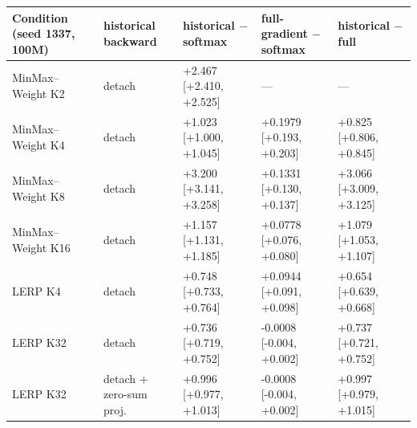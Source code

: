 \begin{tabular}{lllll}
\toprule
Condition (seed 1337, 100M) & historical backward & historical $-$ softmax & full-gradient $-$ softmax & historical $-$ full \\
\midrule
MinMax--Weight K2 & detach & +2.467 [+2.410, +2.525] & --- & --- \\
MinMax--Weight K4 & detach & +1.023 [+1.000, +1.045] & +0.1979 [+0.193, +0.203] & +0.825 [+0.806, +0.845] \\
MinMax--Weight K8 & detach & +3.200 [+3.141, +3.258] & +0.1331 [+0.130, +0.137] & +3.066 [+3.009, +3.125] \\
MinMax--Weight K16 & detach & +1.157 [+1.131, +1.185] & +0.0778 [+0.076, +0.080] & +1.079 [+1.053, +1.107] \\
LERP K4 & detach & +0.748 [+0.733, +0.764] & +0.0944 [+0.091, +0.098] & +0.654 [+0.639, +0.668] \\
LERP K32 & detach & +0.736 [+0.719, +0.752] & -0.0008 [-0.004, +0.002] & +0.737 [+0.721, +0.752] \\
LERP K32 & detach + zero-sum proj. & +0.996 [+0.977, +1.013] & -0.0008 [-0.004, +0.002] & +0.997 [+0.979, +1.015] \\
\bottomrule
\end{tabular}
